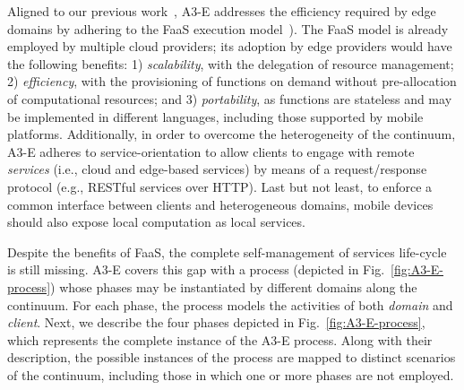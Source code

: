 

Aligned to our previous work~\cite{GarrigaMendonca2017}, A3-E addresses the efficiency required by edge domains by adhering to the FaaS execution model~\cite{MateosFaaster17}). 
The FaaS model is already employed by multiple cloud providers; its adoption by edge providers would have the following benefits: 1) \textit{scalability}, with the delegation of resource management; 2) \textit{efficiency}, with the provisioning of functions on demand without pre-allocation of computational resources; and 3) \textit{portability}, as functions are stateless and may be implemented in different languages, including those supported by mobile platforms. Additionally, in order to overcome the heterogeneity of the continuum, A3-E adheres to service-orientation to allow clients to engage with remote \textit{services} (i.e., cloud and edge-based services) by means of a request/response protocol (e.g., RESTful services over HTTP). Last but not least, to enforce a common interface between clients and heterogeneous domains, mobile devices should also expose local computation as local services. 

Despite the benefits of FaaS, the complete self-management of services life-cycle is still missing. A3-E covers this gap with a process (depicted in Fig.~\ref{fig:A3-E-process}) whose phases may be instantiated by different domains along the continuum. For each phase, the process models the activities of both \textit{domain} and \textit{client}. Next, we describe the four phases depicted in Fig.~\ref{fig:A3-E-process}, which represents the complete instance of the A3-E process. Along with their description, the possible instances of the process are mapped to distinct scenarios of the continuum, including those in which one or more phases are not employed.


